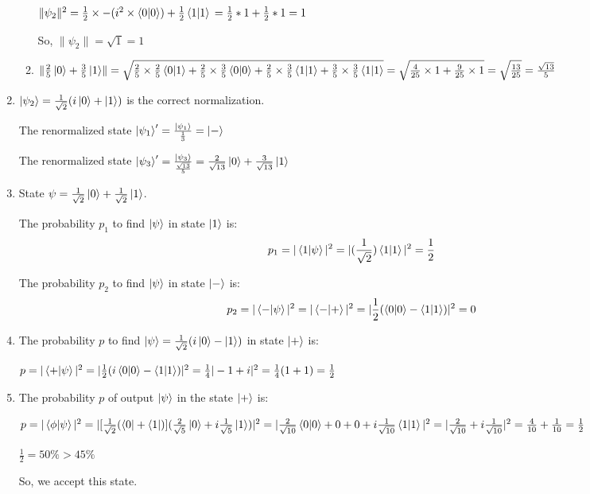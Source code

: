 \documentclass{article}
\begin{document}
\begin{enumerate}
\begin{enumerate}
        $\lVert\psi_2\rVert^2
        \\=\frac{1}{2}\times -(i^2\times\braket{0|0})+\frac{1}{2}\braket{1|1}
        \\=\frac{1}{2}*1+\frac{1}{2}*1
        \\=1
        $

        So, $\lVert\psi_2\rVert=\sqrt{1}=1$
    \item $\lVert\frac{2}{5}\ket{0}+\frac{3}{5}\ket{1}\rVert
    \\=\sqrt{\frac{2}{5}\times\frac{2}{5}\braket{0|1}+\frac{2}{5}\times\frac{3}{5}\braket{0|0}+\frac{2}{5}\times\frac{3}{5}\braket{1|1}+\frac{3}{5}\times\frac{3}{5}\braket{1|1}}
    \\=\sqrt{\frac{4}{25}\times1+\frac{9}{25}\times1}
    \\=\sqrt{\frac{13}{25}}
    \\=\frac{\sqrt{13}}{5}
    $
    \end{enumerate}
    \item $\ket{\psi_2}=\frac{1}{\sqrt{2}}(i\ket{0}+\ket{1})$ is the correct normalization.
    
    The renormalized state $\ket{\psi_1}'=\frac{\ket{\psi_1}}{\frac{1}{3}}=\ket{-}$

    The renormalized state $\ket{\psi_3}'=\frac{\ket{\psi_3}}{\frac{\sqrt{13}}{5}}=\frac{2}{\sqrt{13}}\ket{0}+\frac{3}{\sqrt{13}}\ket{1}$
    \item State $\psi=\frac{1}{\sqrt{2}}\ket{0}+\frac{1}{\sqrt{2}}\ket{1}$.
    
    The probability $p_1$ to find $\ket{\psi}$ in state $\ket{1}$ is:
\[p_1=|\braket{1|\psi}|^2=|(\frac{1}{\sqrt{2}})\braket{1|1}|^2=\frac{1}{2}\]


The probability $p_2$ to find $\ket{\psi}$ in state $\ket{-}$ is:
\[p_2=|\braket{-|\psi}|^2=|\braket{-|+}|^2=|\frac{1}{2}(\braket{0|0}-\braket{1|1})|^2=0\]

\item The probability $p$ to find $\ket{\psi}=\frac{1}{\sqrt{2}}(i\ket{0}-\ket{1})$ in state $\ket{+}$ is:

$p=|\braket{+|\psi}|^2=|\frac{1}{2}(i\braket{0|0}-\braket{1|1})|^2=\frac{1}{4}|-1+i|^2=\frac{1}{4}(1+1)=\frac{1}{2}$

\item The probability $p$ of output $\ket{\psi}$ in the state $\ket{+}$ is:

$p=|\braket{\phi|\psi}|^2=|[\frac{1}{\sqrt{2}}(\bra{0}+\bra{1})](\frac{2}{\sqrt{5}}\ket{0}+i\frac{1}{\sqrt{5}}\ket{1})|^2
\\=|\frac{2}{\sqrt{10}}\braket{0|0}+0+0+i\frac{1}{\sqrt{10}}\braket{1|1}|^2
\\=|\frac{2}{\sqrt{10}}+i\frac{1}{\sqrt{10}}|^2
\\=\frac{4}{10}+\frac{1}{10}
\\=\frac{1}{2}$

$\frac{1}{2}=50\%>45\%$

So, we accept this state.

\end{enumerate}
\end{document}
